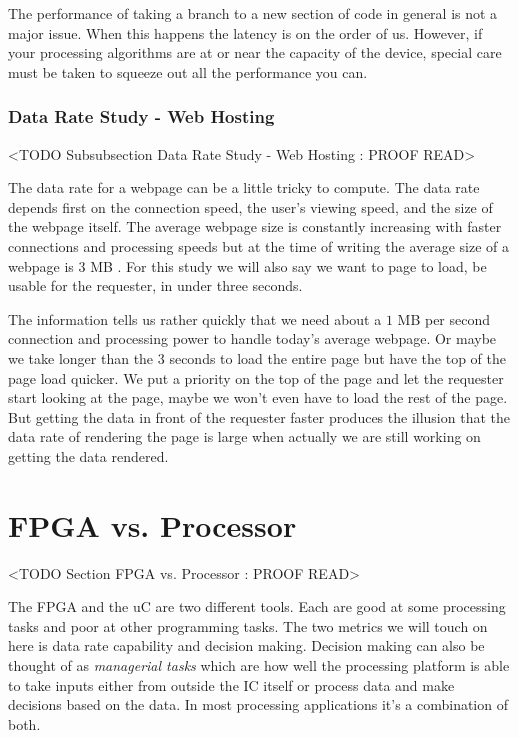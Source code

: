 The performance of taking a branch to a new section of code in general is not a major issue. When this happens the latency is on the order of \ac{us}. However, if your processing algorithms are at or near the capacity of the device, special care must be taken to squeeze out all the performance you can.
	
\subsubsection{Data Rate Study - Web Hosting}
	<TODO Subsubsection  Data Rate Study - Web Hosting : PROOF READ>

The data rate for a webpage can be a little tricky to compute. The data rate depends first on the connection speed, the user's viewing speed, and the size of the webpage itself. The average webpage size is constantly increasing with faster connections and processing speeds but at the time of writing the average size of a webpage is $3$ \ac{MB} \cite{google}. For this study we will also say we want to page to load, be usable for the requester, in under three seconds.

The information tells us rather quickly that we need about a $1$ \ac{MB} per second connection and processing power to handle today's average webpage. Or maybe we take longer than the $3$ seconds to load the entire page but have the top of the page load quicker. We put a priority on the top of the page and let the requester start looking at the page, maybe we won't even have to load the rest of the page. But getting the data in front of the requester faster produces the illusion that the data rate of rendering the page is large when actually we are still working on getting the data rendered. 
	
\section{FPGA vs. Processor}
	<TODO Section FPGA vs. Processor : PROOF READ>

The \ac{FPGA} and the \ac{uC} are two different tools. Each are good at some processing tasks and poor at other programming tasks. The two metrics we will touch on here is data rate capability and decision making. Decision making can also be thought of as \emph{managerial tasks} which are how well the processing platform is able to take inputs either from outside the \ac{IC} itself or process data and make decisions based on the data. In most processing applications it's a combination of both.
	
